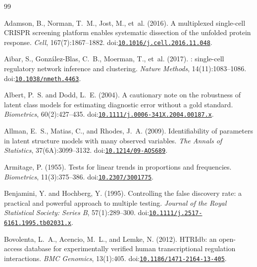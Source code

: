 \begin{thebibliography}{99}

Adamson, B., Norman, T.~M., Jost, M., et~al. (2016).
\newblock A multiplexed single-cell {CRISPR} screening platform enables systematic dissection of the unfolded protein response.
\newblock \emph{Cell}, 167(7):1867--1882.
\newblock doi:\href{https://doi.org/10.1016/j.cell.2016.11.048}{\nolinkurl{10.1016/j.cell.2016.11.048}}.

Aibar, S., Gonz{\'a}lez-Blas, C.~B., Moerman, T., et~al. (2017).
: single-cell regulatory network inference and clustering.
\newblock \emph{Nature Methods}, 14(11):1083--1086.
\newblock doi:\href{https://doi.org/10.1038/nmeth.4463}{\nolinkurl{10.1038/nmeth.4463}}.

Albert, P.~S. and Dodd, L.~E. (2004).
\newblock A cautionary note on the robustness of latent class models for estimating diagnostic error without a gold standard.
\newblock \emph{Biometrics}, 60(2):427--435.
\newblock doi:\href{https://doi.org/10.1111/j.0006-341X.2004.00187.x}{\nolinkurl{10.1111/j.0006-341X.2004.00187.x}}.

Allman, E.~S., Matias, C., and Rhodes, J.~A. (2009).
\newblock Identifiability of parameters in latent structure models with many observed variables.
\newblock \emph{The Annals of Statistics}, 37(6A):3099--3132.
\newblock doi:\href{https://doi.org/10.1214/09-AOS689}{\nolinkurl{10.1214/09-AOS689}}.

Armitage, P. (1955).
\newblock Tests for linear trends in proportions and frequencies.
\newblock \emph{Biometrics}, 11(3):375--386.
\newblock doi:\href{https://doi.org/10.2307/3001775}{\nolinkurl{10.2307/3001775}}.

Benjamini, Y. and Hochberg, Y. (1995).
\newblock Controlling the false discovery rate: a practical and powerful approach to multiple testing.
\newblock \emph{Journal of the Royal Statistical Society: Series B}, 57(1):289--300.
\newblock doi:\href{https://doi.org/10.1111/j.2517-6161.1995.tb02031.x}{\nolinkurl{10.1111/j.2517-6161.1995.tb02031.x}}.

Bovolenta, L.~A., Acencio, M.~L., and Lemke, N. (2012).
\newblock HTRIdb: an open-access database for experimentally verified human transcriptional regulation interactions.
\newblock \emph{BMC Genomics}, 13(1):405.
\newblock doi:\href{https://doi.org/10.1186/1471-2164-13-405}{\nolinkurl{10.1186/1471-2164-13-405}}.


\end{thebibliography}
